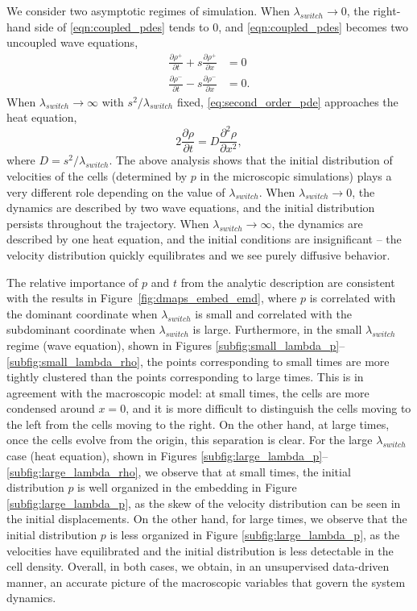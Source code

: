 We consider two asymptotic regimes of simulation.
%
When $\lambda_{switch} \rightarrow 0$, the right-hand side of \eqref{eqn:coupled_pdes} tends to 0, and \eqref{eqn:coupled_pdes} becomes two uncoupled wave equations,
\begin{equation}
\begin{aligned}
\frac{\partial \rho^+}{\partial t} + s \frac{\partial \rho^+}{\partial x} & = 0 \\
\frac{\partial \rho^-}{\partial t} - s \frac{\partial \rho^-}{\partial x} & = 0.
\end{aligned}
\end{equation}
%
When $\lambda_{switch} \rightarrow \infty$ with $s^2/\lambda_{switch}$ fixed, \eqref{eq:second_order_pde} approaches the heat equation,
\begin{equation}
2 \frac{\partial \rho}{\partial t} = D \frac{\partial ^2 \rho}{\partial x^2},
\end{equation}
%
where $D=s^2/\lambda_{switch}$.
%
The above analysis shows that the initial distribution of velocities of the cells (determined by $p$ in the microscopic simulations) plays a very different role depending on the value of $\lambda_{switch}$.
%
When $\lambda_{switch} \rightarrow 0$, the dynamics are described by two wave equations, and the initial distribution persists throughout the trajectory.
%
When $\lambda_{switch} \rightarrow \infty$, the dynamics are described by one heat equation, and the initial conditions are insignificant -- the velocity distribution quickly equilibrates and we see purely diffusive behavior.

The relative importance of $p$ and $t$ from the analytic description are consistent with the results in Figure~\ref{fig:dmaps_embed_emd}, where $p$ is correlated with the dominant coordinate when $\lambda_{switch}$ is small and correlated with the subdominant coordinate when $\lambda_{switch}$ is large.
%
Furthermore, in the small $\lambda_{switch}$ regime (wave equation), shown in Figures \ref{subfig:small_lambda_p}--\ref{subfig:small_lambda_rho}, the points corresponding to small times are more tightly clustered than the points corresponding to large times.
%
This is in agreement with the macroscopic model: at small times, the cells are more condensed around $x=0$, and it is more difficult to distinguish the cells moving to the left from the cells moving to the right.
%
On the other hand, at large times, once the cells evolve from the origin, this separation is clear.
%
For the large $\lambda_{switch}$ case (heat equation), shown in Figures \ref{subfig:large_lambda_p}--\ref{subfig:large_lambda_rho}, we observe that at small times, the initial distribution $p$ is well organized in the embedding in Figure \ref{subfig:large_lambda_p}, as the skew of the velocity distribution can be seen in the initial displacements.
%
On the other hand, for large times, we observe that the initial distribution $p$ is less organized in Figure \ref{subfig:large_lambda_p}, as the velocities have equilibrated and the initial distribution is less detectable in the cell density.
%
Overall, in both cases, we obtain, in an unsupervised data-driven manner, an accurate picture of the macroscopic variables that govern the system dynamics.

